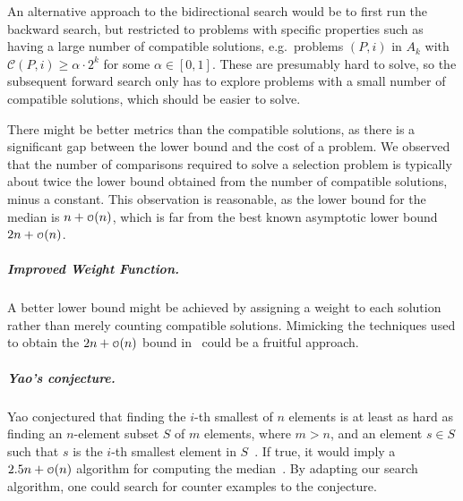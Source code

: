 \documentclass[a4paper,UKenglish,cleveref, autoref, thm-restate]{lipics-v2021}
\newcommand\smallO{
\mathchoice
{{\scriptstyle\mathcal{O}}}%
{{\scriptstyle\mathcal{O}}}%
{{\scriptscriptstyle\mathcal{O}}}%
{\scalebox{.50}{$\scriptscriptstyle\mathcal{O}$}}%
}
\begin{document}
An alternative approach to the bidirectional search would be to first run the backward search, but restricted to problems with specific properties such as having a large number of compatible solutions, e.g.\ problems $(P, i)$ in $A_k$ with $\mathcal{C}(P, i) \ge \alpha \cdot 2^k$ for some $\alpha \in [0, 1]$.
These are presumably hard to solve, so the subsequent forward search only has to explore problems with a small number of compatible solutions, which should be easier to solve.

There might be better metrics than the compatible solutions, as there is a significant gap between the lower bound and the cost of a problem.
We observed that the number of comparisons required to solve a selection problem is typically about twice the lower bound obtained from the number of compatible solutions, minus a constant.
This observation is reasonable, as the lower bound for the median is $n + \smallO(n)$, which is far from the best known asymptotic lower bound $2n + \smallO(n)$.

\subparagraph{Improved Weight Function.}
A better lower bound might be achieved by assigning a weight to each solution rather than merely counting compatible solutions.
Mimicking the techniques used to obtain the $2n + \smallO(n)$ bound in~\cite{bent1985finding} could be a fruitful approach.

\subparagraph{Yao's conjecture.}
Yao conjectured that finding the $i$-th smallest of $n$ elements is at least as hard as finding an $n$-element subset $S$ of $m$ elements, where $m > n$, and an element $s \in S$ such that $s$ is the $i$-th smallest element in $S$~\cite{yao1974lower}.
If true, it would imply a $2.5n + \smallO(n)$ algorithm for computing the median~\cite{schonhage1975finding}.
By adapting our search algorithm, one could search for counter examples to the conjecture.



  
\end{document}
